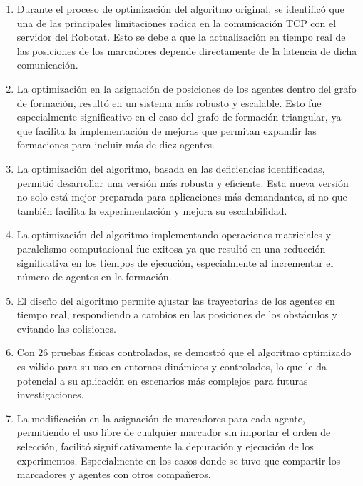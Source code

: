 \begin{enumerate}
	\item Durante el proceso de optimización del algoritmo original, se identificó que una de las principales limitaciones radica en la comunicación TCP con el servidor del Robotat. Esto se debe a que la actualización en tiempo real de las posiciones de los marcadores depende directamente de la latencia de dicha comunicación.
	\item La optimización en la asignación de posiciones de los agentes dentro del grafo de formación, resultó en un sistema más robusto y escalable. Esto fue especialmente significativo en el caso del grafo de formación triangular, ya que facilita la implementación de mejoras que permitan expandir las formaciones para incluir más de diez agentes.
	\item La optimización del algoritmo, basada en las deficiencias identificadas, permitió desarrollar una versión más robusta y eficiente. Esta nueva versión no solo está mejor preparada para aplicaciones más demandantes, si no que también facilita la experimentación y mejora su escalabilidad.
	\item La optimización del algoritmo implementando operaciones matriciales y paralelismo computacional fue exitosa ya que resultó en una reducción significativa en los tiempos de ejecución, especialmente al incrementar el número de agentes en la formación.
	\item El diseño del algoritmo permite ajustar las trayectorias de los agentes en tiempo real, respondiendo a cambios en las posiciones de los obstáculos y evitando las colisiones.
	\item Con $26$ pruebas físicas controladas, se demostró que el algoritmo optimizado es válido para su uso en entornos dinámicos y controlados, lo que le da potencial a su aplicación en escenarios más complejos para futuras investigaciones.
	\item La modificación en la asignación de marcadores para cada agente, permitiendo el uso libre de cualquier marcador sin importar el orden de selección, facilitó significativamente la depuración y ejecución de los experimentos. Especialmente en los casos donde se tuvo que compartir los marcadores y agentes con otros compañeros.
\end{enumerate}